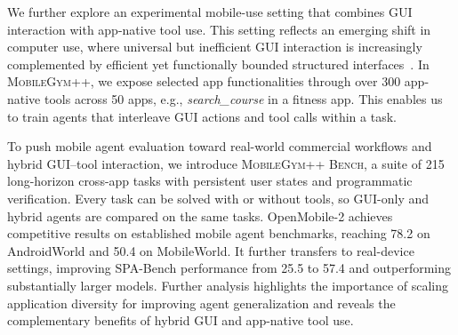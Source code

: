 We further explore an experimental mobile-use setting that combines GUI interaction with app-native tool use. This setting reflects an emerging shift in computer use, where universal but inefficient GUI interaction is increasingly complemented by efficient yet functionally bounded structured interfaces~\citep{hu2026toolcua, shi2026cua}. In \textsc{MobileGym++}, we expose selected app functionalities through over 300 app-native tools across 50 apps, e.g., \textit{search\_course} in a fitness app. This enables us to train agents that interleave GUI actions and tool calls within a task.


To push mobile agent evaluation toward real-world commercial workflows and hybrid GUI--tool interaction, we introduce \textsc{MobileGym++ Bench}, a suite of 215 long-horizon cross-app tasks with persistent user states and programmatic verification. Every task can be solved with or without tools, so GUI-only and hybrid agents are compared on the same tasks.
OpenMobile-2 achieves competitive results on established mobile agent benchmarks, reaching 78.2 on AndroidWorld and 50.4 on MobileWorld.
It further transfers to real-device settings, improving SPA-Bench performance from 25.5 to 57.4 and outperforming substantially larger models.
Further analysis highlights the importance of scaling application diversity for improving agent generalization and reveals the complementary benefits of hybrid GUI and app-native tool use.

